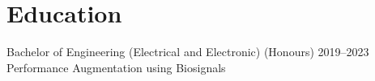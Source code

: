 \section{Education}

{Bachelor of Engineering (Electrical and Electronic) (Honours)}
{2019--2023}
{Performance Augmentation using Biosignals}
\vspace{0.1cm}

